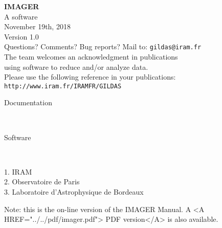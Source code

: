 \documentclass[11pt]{article}
\begin{document}

\begin{center}
  \huge{
  \textbf{IMAGER} 
  } \\[2\bigskipamount]
  \Large{}
  A \gildas{} software\\[\bigskipamount]
  November 19th, 2018\\[\bigskipamount]
  Version 1.0\\[2\bigskipamount]
  \large{}
  Questions? Comments? Bug reports? Mail to: \texttt{gildas@iram.fr}\\[2\bigskipamount]
  The \gildas{} team welcomes an acknowledgment in publications\\
  using \gildas{} software to reduce and/or analyze data.\\
  Please use the following reference in your publications:\\
  \texttt{http://www.iram.fr/IRAMFR/GILDAS}\\[2\bigskipamount]
\end{center}

\begin{description}
\item[Documentation] \mbox{}\\
\item[Software] \mbox{}\\
\end{description}
1. IRAM\\
2. Observatoire de Paris\\
3. Laboratoire d'Astrophysique de Bordeaux

\begin{rawhtml}
  Note: this is the on-line version of the IMAGER Manual.
  A <A HREF="../../pdf/imager.pdf"> PDF version</A>
  is also available.
\end{rawhtml}

\bigskip{} %
\end{document}
